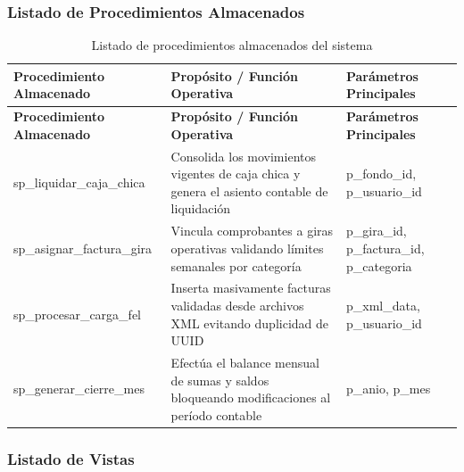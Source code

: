 \subsubsection{Listado de Procedimientos Almacenados}

{
\small
{}
\setlength{\parindent}{0pt}
\begin{xltabular}{\linewidth}{
    >{\raggedright\arraybackslash}p{3.8cm} 
    >{\raggedright\arraybackslash}X 
    >{\raggedright\arraybackslash}p{3.5cm}
}
    \caption{Listado de procedimientos almacenados del sistema} \label{tab:cap4_bd_sp} \\
    \toprule
    \textbf{Procedimiento Almacenado} & \textbf{Propósito / Función Operativa} & \textbf{Parámetros Principales} \\
    \midrule
    \endfirsthead

    \toprule
    \textbf{Procedimiento Almacenado} & \textbf{Propósito / Función Operativa} & \textbf{Parámetros Principales} \\
    \midrule
    \endhead

    \endfoot
\bottomrule
\endlastfoot

    \textrm{sp\_liquidar\_caja\_chica} & Consolida los movimientos vigentes de caja chica y genera el asiento contable de liquidación & \textrm{p\_fondo\_id}, \textrm{p\_usuario\_id} \\
    \addlinespace
    \textrm{sp\_asignar\_factura\_gira} & Vincula comprobantes a giras operativas validando límites semanales por categoría & \textrm{p\_gira\_id}, \textrm{p\_factura\_id}, \textrm{p\_categoria} \\
    \addlinespace
    \textrm{sp\_procesar\_carga\_fel} & Inserta masivamente facturas validadas desde archivos XML evitando duplicidad de UUID & \textrm{p\_xml\_data}, \textrm{p\_usuario\_id} \\
    \addlinespace
    \textrm{sp\_generar\_cierre\_mes} & Efectúa el balance mensual de sumas y saldos bloqueando modificaciones al período contable & \textrm{p\_anio}, \textrm{p\_mes} \\
\end{xltabular}
}

\subsubsection{Listado de Vistas}

